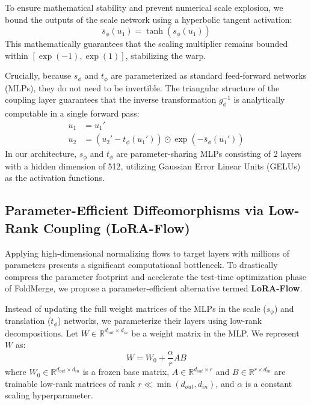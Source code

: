 To ensure mathematical stability and prevent numerical scale explosion, we bound the outputs of the scale network using a hyperbolic tangent activation:
\begin{equation}
  \bar{s}_\phi(u_1) = \tanh(s_\phi(u_1))
\end{equation}
This mathematically guarantees that the scaling multiplier remains bounded within $[\exp(-1), \exp(1)]$, stabilizing the warp.

Crucially, because $s_\phi$ and $t_\phi$ are parameterized as standard feed-forward networks (MLPs), they do not need to be invertible. 
The triangular structure of the coupling layer guarantees that the inverse transformation $g_\phi^{-1}$ is analytically computable in a single forward pass:
\begin{align}
  u_1 &= u_1' \\
  u_2 &= (u_2' - t_\phi(u_1')) \odot \exp(-\bar{s}_\phi(u_1'))
\end{align}
In our architecture, $s_\phi$ and $t_\phi$ are parameter-sharing MLPs consisting of 2 layers with a hidden dimension of 512, utilizing Gaussian Error Linear Units (GELUs) as the activation functions.

\subsection{Parameter-Efficient Diffeomorphisms via Low-Rank Coupling (LoRA-Flow)}
Applying high-dimensional normalizing flows to target layers with millions of parameters presents a significant computational bottleneck. To drastically compress the parameter footprint and accelerate the test-time optimization phase of FoldMerge, we propose a parameter-efficient alternative termed \textbf{LoRA-Flow}. 

Instead of updating the full weight matrices of the MLPs in the scale ($s_\phi$) and translation ($t_\phi$) networks, we parameterize their layers using low-rank decompositions. Let $W \in \mathbb{R}^{d_{out} \times d_{in}}$ be a weight matrix in the MLP. We represent $W$ as:
\begin{equation}
  W = W_{0} + \frac{\alpha}{r} A B
\end{equation}
where $W_{0} \in \mathbb{R}^{d_{out} \times d_{in}}$ is a frozen base matrix, $A \in \mathbb{R}^{d_{out} \times r}$ and $B \in \mathbb{R}^{r \times d_{in}}$ are trainable low-rank matrices of rank $r \ll \min(d_{out}, d_{in})$, and $\alpha$ is a constant scaling hyperparameter. 

